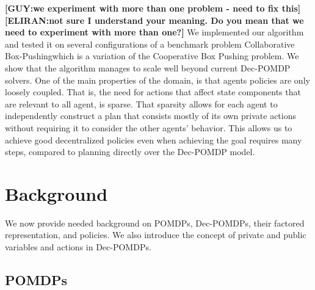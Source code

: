 \documentclass[letterpaper]{article} %
\theoremstyle{definition}
\newcommand{\eliran}[1]{\textbf{[\color{red}ELIRAN:#1]}}
\newcommand{\guy}[1]{\textbf{[\color{orange}GUY:#1]}}
\newcommand{\cbp}[0]{Collaborative Box-Pushing}
\begin{document}
\guy{we experiment with more than one problem - need to fix this}\eliran{not sure I understand your meaning. Do you mean that we need to experiment with more than one?}
We implemented our algorithm and tested it on several configurations of a benchmark problem \cbp which is a variation of the Cooperative Box Pushing problem. We show that the algorithm manages to scale well beyond
current Dec-POMDP solvers.
One of the main properties of the domain, is that agents policies are only loosely coupled. That is, the need for actions that affect state components that are relevant to all agent, is sparse. That sparsity allows for each agent to independently construct a plan that consists mostly of its own private actions without requiring it to consider the other agents' behavior. This allows us to achieve good decentralized policies even when achieving the goal requires many steps, compared to planning directly over the Dec-POMDP model.






\section{Background}

We now provide needed background on POMDPs, Dec-POMDPs, their factored representation, and policies. We also introduce the concept of private and public variables and actions in Dec-POMDPs.


\subsection{POMDPs}
\end{document}
